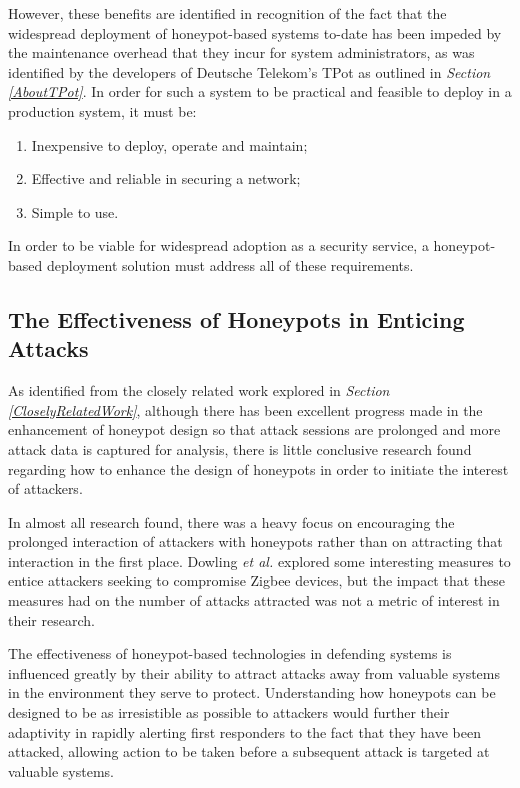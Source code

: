 However, these benefits are identified in recognition of the fact that the widespread deployment of honeypot-based systems to-date has been impeded by the maintenance overhead that they incur for system administrators, as was identified by the developers of Deutsche Telekom's TPot as outlined in \textit{Section \ref{AboutTPot}}. In order for such a system to be practical and feasible to deploy in a production system, it must be:

\begin{enumerate}
    \item Inexpensive to deploy, operate and maintain;
    \item Effective and reliable in securing a network;
    \item Simple to use.
\end{enumerate}
    
In order to be viable for widespread adoption as a security service, a honeypot-based deployment solution must address all of these requirements.
	
\subsection{The Effectiveness of Honeypots in Enticing Attacks}
As identified from the closely related work explored in \textit{Section \ref{CloselyRelatedWork}}, although there has been excellent progress made in the enhancement of honeypot design so that attack sessions are prolonged and more attack data is captured for analysis, there is little conclusive research found regarding how to enhance the design of honeypots in order to initiate the interest of attackers. 

In almost all research found, there was a heavy focus on encouraging the prolonged interaction of attackers with honeypots rather than on attracting that interaction in the first place. \cite{CowrieWebsite} \cite{IoTPot2016} \cite{IoTCandyJar} \cite{Dowling2017} Dowling \textit{et al.} explored some interesting measures to entice attackers seeking to compromise Zigbee devices, but the impact that these measures had on the number of attacks attracted was not a metric of interest in their research. \cite{Dowling2017}

The effectiveness of honeypot-based technologies in defending systems is influenced greatly by their ability to attract attacks away from valuable systems in the environment they serve to protect. Understanding how honeypots can be designed to be as irresistible as possible to attackers would further their adaptivity in rapidly alerting first responders to the fact that they have been attacked, allowing action to be taken before a subsequent attack is targeted at valuable systems.


